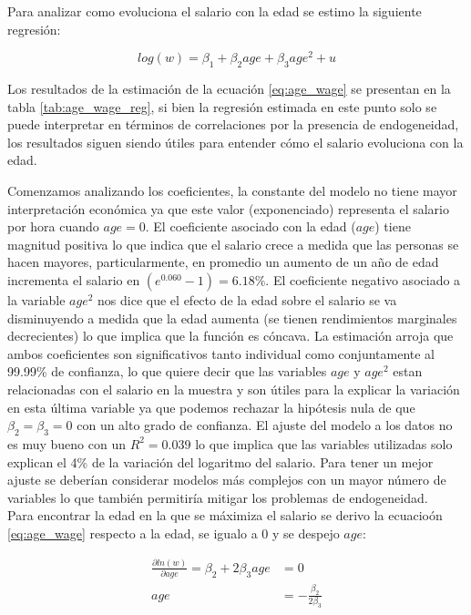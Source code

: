 \documentclass[10pt]{article}
\begin{document}
{Para analizar como evoluciona el salario con la edad se estimo la siguiente regresi\'on: }

\begin{equation}
\label{eq:age_wage}
    log(w)= \beta_1+\beta_2age+\beta_3age^2+u
\end{equation}



{Los resultados de la estimaci\'on de la ecuaci\'on \ref{eq:age_wage} se presentan en la tabla \ref{tab:age_wage_reg}, si bien la regresi\'on estimada en este punto solo se puede interpretar en t\'erminos de correlaciones por la presencia de endogeneidad, los resultados siguen siendo \'utiles para entender c\'omo el salario evoluciona con la edad.} 

{Comenzamos analizando los coeficientes, la constante del modelo no tiene mayor interpretaci\'on econ\'omica ya que este valor (exponenciado) representa el salario por hora cuando $age=0$. El coeficiente asociado con la edad ($age$) tiene magnitud positiva lo que indica que el salario crece a medida que las personas se hacen mayores, particularmente, en promedio un aumento de un año de edad incrementa el salario en $(e^{0.060}-1)=6.18\%$. El coeficiente negativo asociado a la variable $age^2$ nos dice que el efecto de la edad sobre el salario se va disminuyendo a medida que la edad aumenta (se tienen rendimientos marginales decrecientes) lo que implica que la funci\'on es c\'oncava. La estimaci\'on arroja que ambos coeficientes son significativos tanto individual como conjuntamente al 99.99\% de confianza, lo que quiere decir que las variables $age$ y $age^2$ estan relacionadas con el salario en la muestra y son \'utiles para la explicar la variaci\'on en esta \'ultima variable ya que podemos rechazar la hip\'otesis nula de que $\beta_2=\beta_3=0$ con un alto grado de confianza. El ajuste del modelo a los datos no es muy bueno con un $R^2 = 0.039$ lo que implica que las variables utilizadas solo explican el 4\% de la variaci\'on del logaritmo del salario. Para tener un mejor ajuste se deber\'ian considerar modelos m\'as complejos con un mayor n\'umero de variables lo que tambi\'en permitir\'ia mitigar los problemas de endogeneidad.} \\

{Para encontrar la edad en la que se m\'aximiza el salario se derivo la ecuacio\'on \ref{eq:age_wage} respecto a la edad, se igualo a 0 y se despejo $age$: }

\begin{align*}
    \frac{\partial ln(w)}{\partial age}=\beta_2+2\beta_3age &= 0 \\
    age &= -\frac{\beta_2}{2\beta_3}
\end{align*}
\end{document}
